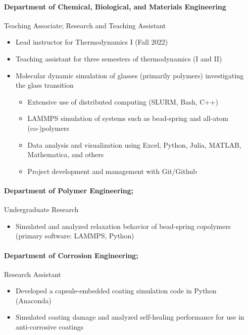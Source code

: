 \documentclass{my_cv}
\begin{document}
\paragraph{Department of Chemical, Biological, and Materials Engineering\\}
Teaching Associate; Research and Teaching Assistant
\begin{itemize}
    \item Lead instructor for Thermodynamics I (Fall 2022)
    \item Teaching assistant for three semesters of thermodynamics (I and II)
    \item Molecular dynamic simulation of glasses (primarily polymers) investigating the glass transition
    \begin{itemize}
        \item Extensive use of distributed computing (SLURM, Bash, C++)
        \item LAMMPS simulation of systems such as bead-spring and all-atom (co-)polymers
        \item Data analysis and visualization using Excel, Python, Julia, MATLAB, Mathematica, and others
        \item Project development and management with Git/Github
    \end{itemize}
\end{itemize}

\paragraph{Department of Polymer Engineering;}
Undergraduate Research
\begin{itemize}
    \item Simulated and analyzed relaxation behavior of bead-spring co\-polymers (primary software: LAMMPS, Python)
\end{itemize}

\paragraph{Department of Corrosion Engineering;}
Research Assistant
\begin{itemize}
    \item Developed a capsule-embedded coating simulation code in Python (Anaconda)
    \item Simulated coating damage and analyzed self-healing performance for use in anti-corrosive coatings
\end{itemize}
\end{document}
